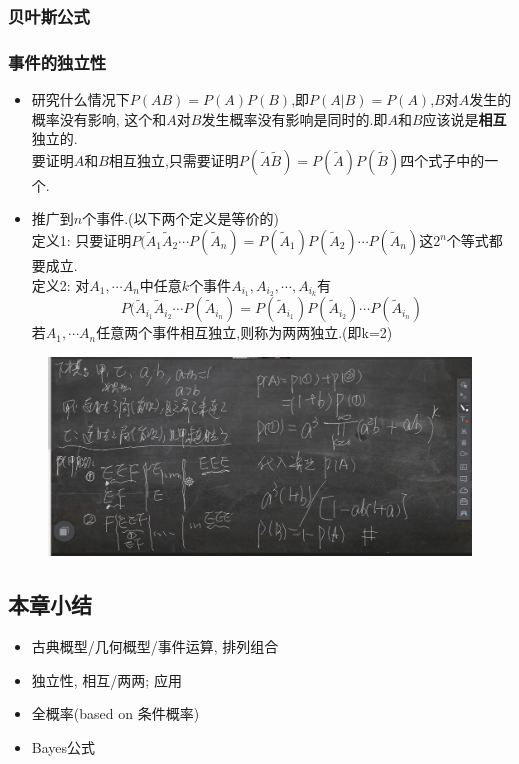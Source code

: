 \documentclass[UTF8]{article}
\newcommand{\itemblt}{\item[$\bullet$]}
\begin{document}
\subsubsection{贝叶斯公式}

\subsubsection{事件的独立性}
\begin{itemize}
	\itemblt 研究什么情况下$P(AB)=P(A)P(B)$,即$P(A|B)=P(A)$,$B$对$A$发生的概率没有影响, 这个和$A$对$B$发生概率没有影响是同时的.即$A$和$B$应该说是\textbf{相互}独立的.\\
	要证明$A$和$B$相互独立,只需要证明$P(\tilde{A}\tilde{B})=P(\tilde{A})P(\tilde{B})$四个式子中的一个.
	
	\itemblt 推广到$n$个事件.(以下两个定义是等价的)\\
	定义1: 只要证明$P(\tilde{A}_1\tilde{A}_2\cdots P(\tilde{A}_n)=P(\tilde{A}_1)P(\tilde{A}_2)\cdots P(\tilde{A}_n)$这$2^n$个等式都要成立.\\
	定义2: 对$A_1,\cdots A_n$中任意$k$个事件$A_{i_1},A_{i_2},\cdots,A_{i_k}$有$$P(\tilde{A}_{i_1}\tilde{A}_{i_2}\cdots P(\tilde{A}_{i_n})=P(\tilde{A}_{i_1})P(\tilde{A}_{i_2})\cdots P(\tilde{A}_{i_n})$$
	若$A_1,\cdots A_n$任意两个事件相互独立,则称为两两独立.(即k=2)
\end{itemize}


\begin{figure}[H]
	\centering
	\includegraphics[scale=0.4]{2020_3_3_1.png}
\end{figure}\par

\subsection{本章小结}
\begin{itemize}
	\itemblt 古典概型/几何概型/事件运算, 排列组合
	\itemblt 独立性, 相互/两两; 应用
	\itemblt 全概率(based on 条件概率)
	\itemblt Bayes公式
\end{itemize}
\end{document}
